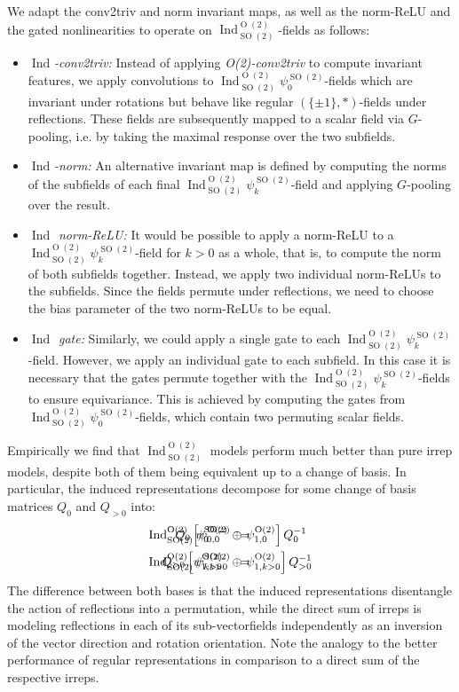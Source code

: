 \documentclass{article}
\renewcommand{\O}[1]{\ensuremath{\operatorname{O}(#1)}}
\newcommand{\SO}[1]{\ensuremath{\operatorname{SO}(#1)}}
\newcommand{\Flip}{(\{\pm 1\}, *)}
\newcommand{\Ind}[2]{\ensuremath{\operatorname{Ind}_{#1}^{#2}}}
\begin{document}
We adapt the conv2triv and norm invariant maps, as well as the norm-ReLU and the gated nonlinearities to operate on $\Ind{\SO2}{\O2}$-fields as follows:
\begin{itemize}[leftmargin=7ex]
\setlength{\itemindent}{-4ex}
    \item \textit{$\Ind{}{}$-conv2triv:}
        Instead of applying \textit{O(2)-conv2triv} to compute invariant features, we apply convolutions to $\Ind{\SO2}{\O2}\psi_0^{\SO2}$-fields which are invariant under rotations but behave like regular $\Flip$-fields under reflections.
        These fields are subsequently mapped to a scalar field via $G$-pooling, i.e. by taking the maximal response over the two subfields.
    \item \textit{$\Ind{}{}$-norm:}
        An alternative invariant map is defined by computing the norms of the subfields of each final $\Ind{\SO2}{\O2}\psi_k^{\SO2}$-field and applying $G$-pooling over the result.
    \item \textit{$\Ind{}{}$ norm-ReLU:}
        It would be possible to apply a norm-ReLU to a $\Ind{\SO2}{\O2}\psi_k^{\SO2}$-field for $k>0$ as a whole, that is, to compute the norm of both subfields together.
        Instead, we apply two individual norm-ReLUs to the subfields.
        Since the fields permute under reflections, we need to choose the bias parameter of the two norm-ReLUs to be equal.
    \item \textit{$\Ind{}{}$ gate:}
        Similarly, we could apply a single gate to each $\Ind{\SO2}{\O2}\psi_k^{\SO2}$-field.
        However, we apply an individual gate to each subfield.
        In this case it is necessary that the gates permute together with the $\Ind{\SO2}{\O2}\psi_k^{\SO2}$-fields to ensure equivariance.
        This is achieved by computing the gates from $\Ind{\SO2}{\O2}\psi_0^{\SO2}$-fields, which contain two permuting scalar fields.
\end{itemize}

Empirically we find that $\Ind{\SO2}{\O2}$ models perform much better than pure irrep models, despite both of them being equivalent up to a change of basis.
In particular, the induced representations decompose for some change of basis matrices $Q_0$ and $Q_{>0}$ into:
\begin{align*}
    \Ind{\SO2}{\O2}\psi^{\SO2}_0     \,\ &=&\mkern-145mu Q_0    \,\Big[ \psi^{\O2}_{0,0}  \ \oplus&\ \psi^{\O2}_{1,0}   \Big]\, Q_0^{-1}    \\
    \Ind{\SO2}{\O2}\psi^{\SO2}_{k>0} \,\ &=&\mkern-145mu Q_{>0} \,\Big[ \psi^{\O2}_{1,k>0}\ \oplus&\ \psi^{\O2}_{1,k>0} \Big]\, Q_{>0}^{-1}
\end{align*}
The difference between both bases is that the induced representations disentangle the action of reflections into a permutation, while the direct sum of irreps is modeling reflections in each of its sub-vectorfields independently as an inversion of the vector direction and rotation orientation.
Note the analogy to the better performance of regular representations in comparison to a direct sum of the respective irreps.


 
	\newpage

\end{document}
